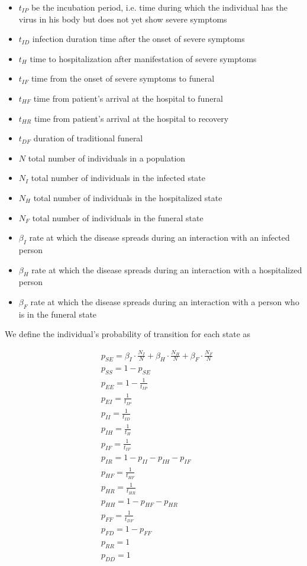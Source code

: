 \begin{itemize}
\item[]$t_{IP}$ be the incubation period, i.e. time during which the individual has the virus in his body but does not yet show severe symptoms
\item[] $t_{ID}$ infection duration time after the onset of severe symptoms
\item[] $t_{H}$ time to hospitalization after manifestation of severe symptoms
\item[] $t_{IF}$ time from the onset of severe symptoms to funeral
\item[] $t_{HF}$ time from patient's arrival at the hospital to funeral
\item[] $t_{HR}$ time from patient's arrival at the hospital to recovery
\item[] $t_{DF}$ duration of traditional funeral
\item[] $N$  total number of individuals in a population
\item[] $N_{I}$  total number of individuals in the infected state
\item[] $N_{H}$  total number of individuals in the hospitalized state
\item[] $N_{F}$  total number of individuals in the funeral state
\item[] $\beta_{I}$ rate at which the disease spreads during an interaction with an infected person
\item[] $\beta_{H}$ rate at which the disease spreads during an interaction with a hospitalized person
\item[] $\beta_{F}$ rate at which the disease spreads during an interaction with a person who is in the funeral state
\end{itemize}
We define the individual's probability of transition for each state as

\begin{subequations}
\begin{alignat}{1}
&p_{SE}=\beta_I\cdot \frac{N_{I}}{N}+\beta_H\cdot \frac{N_{H}}{N}+\beta_F\cdot\frac{ N_F}{N}\\
&p_{SS}=1-p_{SE}\\
&p_{EE}=1-\frac{1}{t_{IP}}\\
&p_{EI}=\frac{1}{t_{IP}}\\
&p_{II}=\frac{1}{t_{ID}}\\
&p_{IH}=\frac{1}{t_{H}}\\
&p_{IF}= \frac{1}{t_{IF}}\\
&p_{IR}=1-p_{II}-p_{IH}-p_{IF}\\
&p_{HF}=\frac{1}{t_{HF}}\\
&p_{HR}=\frac{1}{t_{HR}}\\
&p_{HH}=1-p_{HF}-p_{HR}\\
&p_{FF}=\frac{1}{t_{DF}}\\
&p_{FD}=1-p_{FF}\\
&p_{RR}=1\\
&p_{DD}=1
\end{alignat}
\end{subequations}
